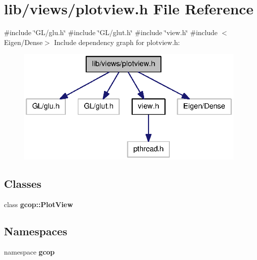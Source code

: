 \section{lib/views/plotview.h \-File \-Reference}
\label{plotview_8h}
{\ttfamily \#include \char`\"{}\-G\-L/glu.\-h\char`\"{}}\*
{\ttfamily \#include \char`\"{}\-G\-L/glut.\-h\char`\"{}}\*
{\ttfamily \#include \char`\"{}view.\-h\char`\"{}}\*
{\ttfamily \#include $<$\-Eigen/\-Dense$>$}\*
\-Include dependency graph for plotview.\-h\-:\nopagebreak
\begin{figure}[H]
\begin{center}
\leavevmode
\includegraphics[width=322pt]{plotview_8h__incl}
\end{center}
\end{figure}
\subsection*{\-Classes}
\begin{DoxyCompactItemize}
\item 
class {\bf gcop\-::\-Plot\-View}
\end{DoxyCompactItemize}
\subsection*{\-Namespaces}
\begin{DoxyCompactItemize}
\item 
namespace {\bf gcop}
\end{DoxyCompactItemize}
